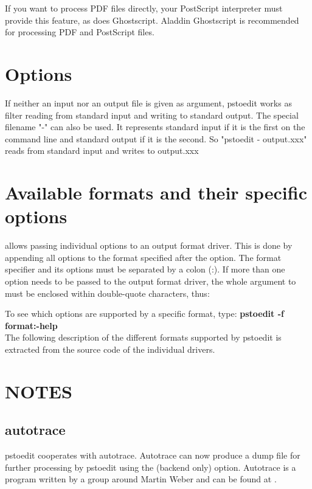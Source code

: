 \documentclass[english,a4paper]{article}
\begin{document}
If you want to process PDF files directly, your PostScript interpreter must
provide this feature, as does Ghostscript. Aladdin Ghostscript is
recommended for processing PDF and PostScript files.

\section{Options}




If neither an input nor an output file is given as argument, pstoedit works as filter reading from standard input and
writing to standard output.
The special filename "-" can also be used. It represents standard input if it is the first on the command line and standard output if it is the second. So "pstoedit - output.xxx" reads from standard input and writes to output.xxx


\section{Available formats and their specific options}

 allows passing individual options to an output format driver. This is done by
appending all options to the format specified after the  option. The format
specifier and its options must be separated by a colon (:). If more than one
option needs to be passed to the output format driver, the whole argument to  must be
enclosed within double-quote characters, thus:


To see which options are supported by a specific format, type:
     \textbf{pstoedit -f format:-help}
     \\

The following description of the different formats supported by pstoedit is extracted from the source code of the individual drivers.



\section{NOTES}


  \subsection{autotrace}

	pstoedit cooperates with autotrace. Autotrace can now produce a dump file
	for further processing by pstoedit using the  (backend only) option.
	Autotrace is a program written by a group around Martin Weber and can be
	found at .
\end{document}
